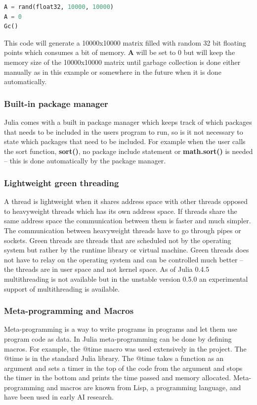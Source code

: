 \documentclass[a4paper,11pt]{article}
\begin{document}
\begin{lstlisting}[language=python]
A = rand(float32, 10000, 10000) 
A = 0
Gc() 
\end{lstlisting}
This code will generate a 10000x10000 matrix filled with random 32 bit floating points which consumes a bit of memory. \textbf{A} will be set to 0 but will keep the memory size of the 10000x10000 matrix until garbage collection is done either manually as in this example or somewhere in the future when it is done automatically. 

\subsubsection{Built-in package manager}
Julia comes with a built in package manager which keeps track of which packages that needs to be included in the users program to run, so is it not necessary to state which packages that need to be included. For example when the user calls the sort function, \textbf{sort()}, no package include statement or \textbf{math.sort()} is needed – this is done automatically by the package manager.

\subsubsection{Lightweight green threading}
A thread is lightweight when it shares address space with other threads opposed to heavyweight threads which has its own address space. If threads share the same address space the communication between them is faster and much simpler. The communication between heavyweight threads have to go through pipes or sockets. Green threads are threads that are scheduled not by the operating system but rather by the runtime library or virtual machine. Green threads does not have to relay on the operating system and can be controlled much better – the threads are in user space and not kernel space. As of Julia 0.4.5 multithreading is not available but in the unstable version 0.5.0 an experimental support of multithreading is available. 

\subsubsection{Meta-programming and Macros}
Meta-programming is a way to write programs in programs and let them use program code as data. In Julia meta-programming can be done by defining macros. For example, the @time macro was used extensively in the project. The @time is in the standard Julia library. The @time takes a function as an argument and sets a timer in the top of the code from the argument and stops the timer in the bottom and prints the time passed and memory allocated. Meta-programming and macros are known from Lisp, a programming language, and have been used in early AI research. 
\end{document}
